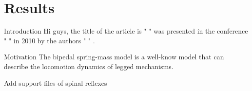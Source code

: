 \documentclass[10pt]{beamer}
\begin{document}
\section{Results}


\begin{frame}
	\begin{exampleblock}{Introduction}
		Hi guys, the title of the article is "  " was presented in the conference " " in 2010 by the authors "  " .
	\end{exampleblock}
	\begin{exampleblock}{Motivation}
		The bipedal spring-mass model is a well-know model that can describe the locomotion  dynamics of legged mechanisms.
	\end{exampleblock}
	\begin{exampleblock}
		Add support files of spinal reflexes
	\end{exampleblock}
\end{frame}
\end{document}
